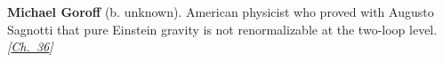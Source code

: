 \textbf{Michael Goroff} (b. unknown). American physicist who proved with Augusto Sagnotti that pure Einstein gravity is not renormalizable at the two-loop level. \emph{[\hyperref[ch:qftvsgr]{Ch.~36}]}

